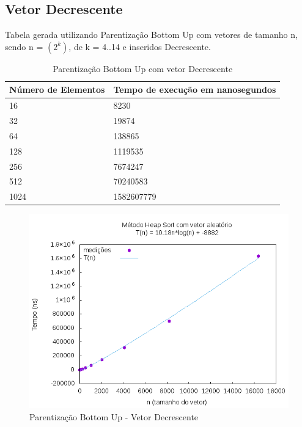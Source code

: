 \documentclass[12pt,a4paper,twoside]{report}
\begin{document}
\subsection{Vetor Decrescente}
Tabela gerada utilizando Parentização Bottom Up com vetores de tamanho n, sendo n = $(2^k)$, de k = 4..14 e inseridos Decrescente.
\begin{table}[H]
\centering
\caption{Parentização Bottom Up com vetor Decrescente}
\label{my-label}
\begin{tabular}{|l|l|}
\hline
\multicolumn{1}{|c|}{\textbf{Número de Elementos}} & \multicolumn{1}{c|}{\textbf{Tempo de execução em nanosegundos}} \\ \hline
16 & 8230 \\ \hline
32 & 19874 \\ \hline
64 & 138865 \\ \hline
128 & 1119535 \\ \hline
256 & 7674247 \\ \hline
512 & 70240583 \\ \hline
1024 & 1582607779 \\ \hline
\end{tabular}
\end{table}

\begin{figure}[H]
    \centering
    \includegraphics[width=0.7\linewidth]{graficos/HeapSort/vIntAleatorio/vIntAleatorio.png}
  \caption{Parentização Bottom Up - Vetor Decrescente}
\end{figure}
\end{document}
